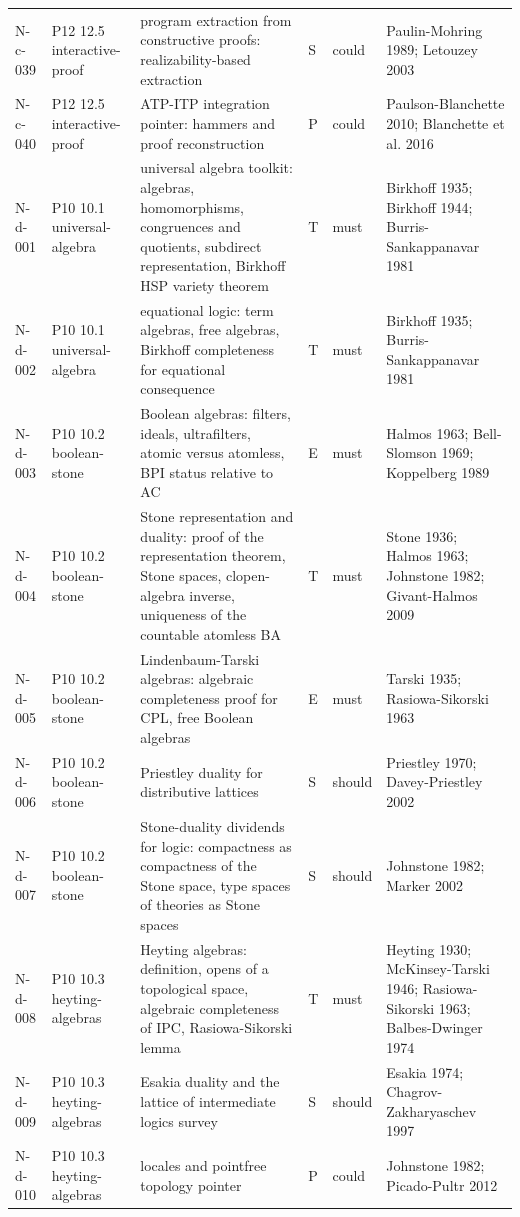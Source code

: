 \begin{longtable}{@{}p{0.52in}p{0.85in}p{2.5in}p{0.22in}p{0.42in}p{1.95in}@{}}
N-c-039 & P12 12.5 interactive-proof & program extraction from constructive proofs: realizability-based extraction & S & could & Paulin-Mohring 1989; Letouzey 2003 \\
N-c-040 & P12 12.5 interactive-proof & ATP-ITP integration pointer: hammers and proof reconstruction & P & could & Paulson-Blanchette 2010; Blanchette et al. 2016 \\
N-d-001 & P10 10.1 universal-algebra & universal algebra toolkit: algebras, homomorphisms, congruences and quotients, subdirect representation, Birkhoff HSP variety theorem & T & must & Birkhoff 1935; Birkhoff 1944; Burris-Sankappanavar 1981 \\
N-d-002 & P10 10.1 universal-algebra & equational logic: term algebras, free algebras, Birkhoff completeness for equational consequence & T & must & Birkhoff 1935; Burris-Sankappanavar 1981 \\
N-d-003 & P10 10.2 boolean-stone & Boolean algebras: filters, ideals, ultrafilters, atomic versus atomless, BPI status relative to AC & E & must & Halmos 1963; Bell-Slomson 1969; Koppelberg 1989 \\
N-d-004 & P10 10.2 boolean-stone & Stone representation and duality: proof of the representation theorem, Stone spaces, clopen-algebra inverse, uniqueness of the countable atomless BA & T & must & Stone 1936; Halmos 1963; Johnstone 1982; Givant-Halmos 2009 \\
N-d-005 & P10 10.2 boolean-stone & Lindenbaum-Tarski algebras: algebraic completeness proof for CPL, free Boolean algebras & E & must & Tarski 1935; Rasiowa-Sikorski 1963 \\
N-d-006 & P10 10.2 boolean-stone & Priestley duality for distributive lattices & S & should & Priestley 1970; Davey-Priestley 2002 \\
N-d-007 & P10 10.2 boolean-stone & Stone-duality dividends for logic: compactness as compactness of the Stone space, type spaces of theories as Stone spaces & S & should & Johnstone 1982; Marker 2002 \\
N-d-008 & P10 10.3 heyting-algebras & Heyting algebras: definition, opens of a topological space, algebraic completeness of IPC, Rasiowa-Sikorski lemma & T & must & Heyting 1930; McKinsey-Tarski 1946; Rasiowa-Sikorski 1963; Balbes-Dwinger 1974 \\
N-d-009 & P10 10.3 heyting-algebras & Esakia duality and the lattice of intermediate logics survey & S & should & Esakia 1974; Chagrov-Zakharyaschev 1997 \\
N-d-010 & P10 10.3 heyting-algebras & locales and pointfree topology pointer & P & could & Johnstone 1982; Picado-Pultr 2012 \\

\end{longtable}
